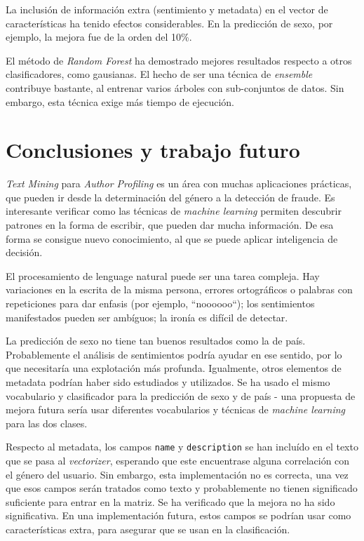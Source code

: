 \documentclass[11pt,a4paper]{article}
\begin{document}
  La inclusi\'on de informaci\'on extra (sentimiento y metadata) en el vector de caracter\'isticas ha tenido efectos considerables. En la predicci\'on de sexo, por ejemplo, la mejora fue de la orden del 10\%. 

  El m\'etodo de {\em Random Forest} ha demostrado mejores resultados respecto a otros clasificadores, como gausianas. El hecho de ser una t\'ecnica de {\em ensemble} contribuye bastante, al entrenar varios \'arboles con sub-conjuntos de datos. Sin embargo, esta t\'ecnica exige m\'as tiempo de ejecuci\'on.


\section{Conclusiones y trabajo futuro}
  
  {\em Text Mining} para {\em Author Profiling} es un \'area con muchas aplicaciones pr\'acticas, que pueden ir desde la determinaci\'on del g\'enero a la detecci\'on de fraude. Es interesante verificar como las t\'ecnicas de {\em machine learning} permiten descubrir patrones en la forma de escribir, que pueden dar mucha informaci\'on. De esa forma se consigue nuevo conocimiento, al que se puede aplicar inteligencia de decisi\'on.

  El procesamiento de lenguage natural puede ser una tarea compleja. Hay variaciones en la escrita de la misma persona, errores ortogr\'aficos o palabras con repeticiones para dar enfasis (por ejemplo, ``noooooo``); los sentimientos manifestados pueden ser amb\'iguos; la iron\'ia es dif\'icil de detectar. 

  La predicci\'on de sexo no tiene tan buenos resultados como la de pa\'is. Probablemente el an\'alisis de sentimientos podr\'ia ayudar en ese sentido, por lo que necesitar\'ia una explotaci\'on m\'as profunda. Igualmente, otros elementos de metadata podr\'ian haber sido estudiados y utilizados. Se ha usado el mismo vocabulario y clasificador para la predicci\'on de sexo y de pa\'is - una propuesta de mejora futura ser\'ia usar diferentes vocabularios y t\'ecnicas de {\em machine learning} para las dos clases.

  Respecto al metadata, los campos {\tt name} y {\tt description} se han inclu\'ido en el texto que se pasa al {\em vectorizer}, esperando que este encuentrase alguna correlaci\'on con el g\'enero del usuario. Sin embargo, esta implementaci\'on no es correcta, una vez que esos campos ser\'an tratados como texto y probablemente no tienen significado suficiente para entrar en la matriz. Se ha verificado que la mejora no ha sido significativa. En una implementaci\'on futura, estos campos se podr\'ian usar como caracter\'isticas extra, para asegurar que se usan en la clasificaci\'on.
  
\end{document}
